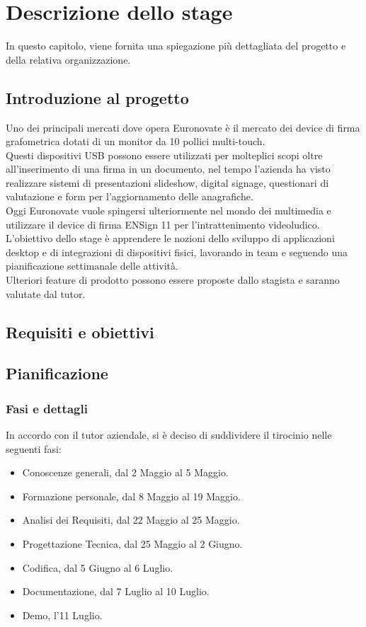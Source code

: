 \chapter{Descrizione dello stage}
\label{cap:descrizione-stage}

In questo capitolo, viene fornita una spiegazione più dettagliata del progetto e della relativa organizzazione.

\section{Introduzione al progetto}

Uno dei principali mercati dove opera Euronovate è il mercato dei device di firma grafometrica
dotati di un monitor da 10 pollici multi-touch.\\ Questi dispositivi USB possono essere utilizzati
per molteplici scopi oltre all'inserimento di una firma in un documento, nel tempo l'azienda ha visto
realizzare sistemi di presentazioni slideshow, digital signage, questionari di valutazione e form
per l'aggiornamento delle anagrafiche.\\ Oggi Euronovate vuole spingersi ulteriormente nel mondo dei
multimedia e utilizzare il device di firma ENSign 11 per l'intrattenimento videoludico.\\
L'obiettivo dello stage è apprendere le nozioni dello sviluppo di applicazioni desktop e di integrazioni di dispositivi fisici, lavorando in team e seguendo una pianificazione
settimanale delle attività.\\ 
Ulteriori feature di prodotto possono essere proposte dallo stagista e saranno valutate dal tutor.

\section{Requisiti e obiettivi}


\section{Pianificazione}

\subsection{Fasi e dettagli}

In accordo con il tutor aziendale, si è deciso di suddividere il tirocinio nelle seguenti fasi:
\begin{itemize}
    \item Conoscenze generali, dal 2 Maggio al 5 Maggio.
    \item Formazione personale, dal 8 Maggio al 19 Maggio.
    \item Analisi dei Requisiti, dal 22 Maggio al 25 Maggio.
    \item Progettazione Tecnica, dal 25 Maggio al 2 Giugno.
    \item Codifica, dal 5 Giugno al 6 Luglio.
    \item Documentazione, dal 7 Luglio al 10 Luglio.
    \item Demo, l'11 Luglio.
\end{itemize}


